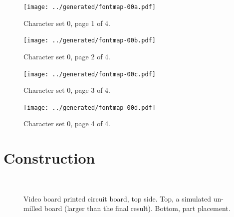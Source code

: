 \begin{figure}
  \centering
  \texttt{[image: ../generated/fontmap-00a.pdf]}
  \caption{Character set 0, page 1 of 4.}
\end{figure}

\begin{figure}
  \centering
  \texttt{[image: ../generated/fontmap-00b.pdf]}
  \caption{Character set 0, page 2 of 4.}
\end{figure}

\begin{figure}
  \centering
  \texttt{[image: ../generated/fontmap-00c.pdf]}
  \caption{Character set 0, page 3 of 4.}
\end{figure}

\begin{figure}
  \centering
  \texttt{[image: ../generated/fontmap-00d.pdf]}
  \caption{Character set 0, page 4 of 4.}
\end{figure}






\section{Construction}

\begin{figure}
  \centering
  \\

  \caption{Video board printed circuit board, top side. Top, a
  simulated un-milled board (larger than the final result). Bottom, part placement.}
\end{figure}

